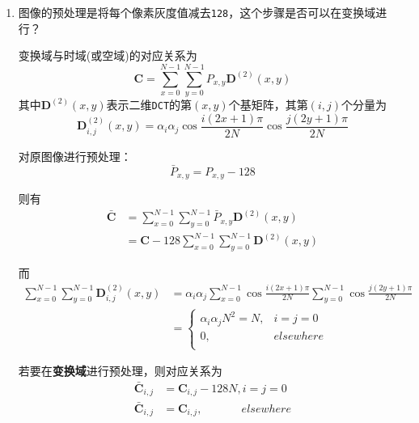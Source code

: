 \documentclass{article}
\numberwithin{figure}{section}
\numberwithin{table}{section}
\numberwithin{listing}{section}
\numberwithin{equation}{section}
\begin{document}
        \begin{enumerate}
            \item 图像的预处理是将每个像素灰度值减去\texttt{128}，这个步骤是否可以在变换域进行？

                变换域与时域(或空域)的对应关系为
                \begin{equation}
                    \mathbf{C}=\sum_{x=0}^{N-1}\sum_{y=0}^{N-1}P_{x,y}\mathbf{D}^{(2)}(x,y)
                \end{equation}
                其中$\mathbf{D}^{(2)}(x,y)$表示二维\texttt{DCT}的第$(x,y)$个基矩阵，其第$(i,j)$个分量为
                \begin{equation}
                    \mathbf{D}_{i,j}^{(2)}(x,y)=\alpha _i\alpha _j\cos{\frac{i(2x+1)\pi}{2N}}\cos{\frac{j(2y+1)\pi}{2N}}
                \end{equation}

                对原图像进行预处理：
                $$\bar{P}_{x,y}=P_{x,y}-128$$

                则有
                \[
                    \begin{split}
                        \bar{\mathbf{C}} & =\sum_{x=0}^{N-1}\sum_{y=0}^{N-1}\bar{P}_{x,y}\mathbf{D}^{(2)}(x,y) \\
                         & =\mathbf{C}-128\sum_{x=0}^{N-1}\sum_{y=0}^{N-1}\mathbf{D}^{(2)}(x,y)
                    \end{split}
                \]

                而
                \[
                    \begin{split}
                        \sum_{x=0}^{N-1} \sum_{y=0}^{N-1} \mathbf{D}_{i,j}^{(2)}(x,y) &= \alpha _i \alpha _j \sum_{x=0}^{N-1} \cos{\frac{i(2x+1)\pi}{2N}} \sum_{y=0}^{N-1} \cos{\frac{j(2y+1)\pi}{2N}}\\
                        &= \left\{
                            \begin{matrix}
                                \alpha _i \alpha _j N^2 = N, & i=j=0\\
                                0, & elsewhere\\
                            \end{matrix}
                        \right.
                    \end{split}
                \]

                若要在\textbf{变换域}进行预处理，则对应关系为
                \[
                    \begin{split}
                        \bar{\mathbf{C}}_{i,j} &= \mathbf{C}_{i,j} - 128N, i=j=0\\
                        \bar{\mathbf{C}}_{i,j} &= \mathbf{C}_{i,j}, \qquad \quad \ \ elsewhere
                    \end{split}
                \]


\end{enumerate}
\end{document}
